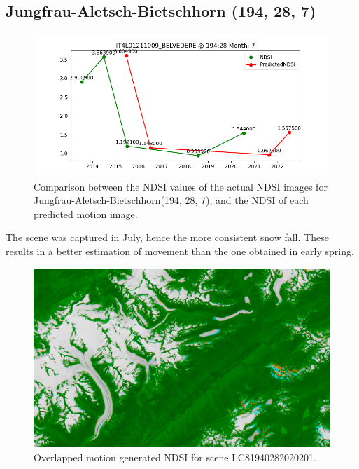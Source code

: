 \documentclass[12pt, a4paper]{report}
\begin{document}
	
	\newpage{}
	
	\subsection{Jungfrau-Aletsch-Bietschhorn (194, 28, 7)}
	
	\begin{figure}[h!]
		\centering
		\includegraphics[width=\linewidth]{../images/experiment_194287.png}
		\caption{Comparison between the NDSI values of the actual NDSI images for Jungfrau-Aletsch-Bietschhorn(194, 28, 7), and the NDSI of each predicted motion image.}
		\label{fig:jungfrau_194287}
	\end{figure}

	The scene was captured in July, hence the more consistent snow fall. These results in a better estimation of movement than the one obtained in early spring.
	
	\begin{figure}[h!]
		\centering
		\includegraphics[width=\linewidth]{../images/experiment_1940287_image.png}
		\caption{Overlapped motion generated NDSI for scene LC81940282020201.}
		\label{fig:experiment_1940287_image}
	\end{figure}
\end{document}
